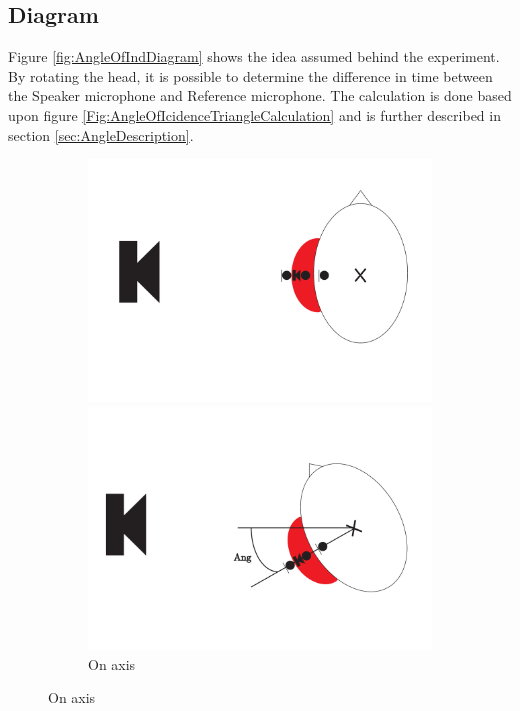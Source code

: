 \subsection{Diagram}

Figure \ref{fig:AngleOfIndDiagram} shows the idea assumed behind the experiment. By rotating the head, it is possible to determine the difference in time between the Speaker microphone and Reference microphone. The calculation is done based upon figure \ref{Fig:AngleOfIcidenceTriangleCalculation} and is further described in section \ref{sec:AngleDescription}.

\begin{figure}[H]
	\centering
	\begin{subfigure}[b]{.4\textwidth}
		\includegraphics[width=\textwidth]{../Journal/Experiments/AngleOfIncidence/AngleOfIncidenceOnAxis.pdf}
		\caption{On axis}
		\label{fig:AngOfIndOnax}
		\vspace{2ex}
		\includegraphics[width=\textwidth]{../Journal/Experiments/AngleOfIncidence/AngleOfIncidenceOffAxis.pdf}

\end{subfigure}
\end{figure}
